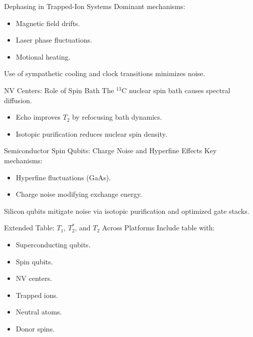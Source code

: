 \documentclass{beamer}
\begin{document}
  \begin{frame}{Dephasing in Trapped-Ion Systems}
    Dominant mechanisms:
    \begin{itemize}
    \item Magnetic field drifts.
    \item Laser phase fluctuations.
    \item Motional heating.
    \end{itemize}
    Use of sympathetic cooling and clock transitions minimizes noise.
  \end{frame}

  \begin{frame}{NV Centers: Role of Spin Bath}
    The $^{13}$C nuclear spin bath causes spectral diffusion.
    \begin{itemize}
    \item Echo improves $T_2$ by refocusing bath dynamics.
    \item Isotopic purification reduces nuclear spin density.
    \end{itemize}
  \end{frame}

  \begin{frame}{Semiconductor Spin Qubits: Charge Noise and Hyperfine Effects}
    Key mechanisms:
    \begin{itemize}
    \item Hyperfine fluctuations (GaAs).
    \item Charge noise modifying exchange energy.
    \end{itemize}
    Silicon qubits mitigate noise via isotopic purification and optimized gate stacks.
  \end{frame}

  \begin{frame}{Extended Table: $T_1$, $T_2^*$, and $T_2$ Across Platforms}
    Include table with:
    \begin{itemize}
    \item Superconducting qubits.
    \item Spin qubits.
    \item NV centers.
    \item Trapped ions.
    \item Neutral atoms.
    \item Donor spins.
    \end{itemize}
  \end{frame}
\end{document}
